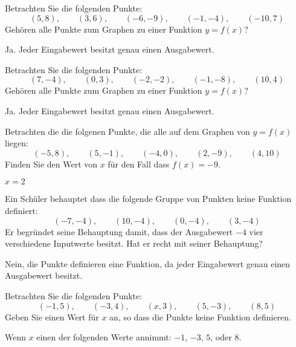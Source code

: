 \begin{exercises}
\begin{exercise} Betrachten Sie die folgenden Punkte:
\[
(5,8),\qquad (3,6), \qquad(-6,-9), \qquad(-1,-4), \qquad(-10,7)
\]
Gehören alle Punkte zum Graphen zu einer Funktion $y =f(x)$?
\begin{answer}
Ja. Jeder Eingabewert besitzt genau einen Ausgabewert.
\end{answer}
\end{exercise}


\begin{exercise} Betrachten Sie die folgenden Punkte:
\[
(7,-4),\qquad (0,3), \qquad(-2,-2), \qquad(-1,-8), \qquad(10,4)
\]
Gehören alle Punkte zum Graphen zu einer Funktion $y =f(x)$?
\begin{answer}
Ja. Jeder Eingabewert besitzt genau einen Ausgabewert.
\end{answer}
\end{exercise}


\begin{exercise} Betrachten die die folgenen Punkte, die alle auf dem Graphen von $y =f(x)$ liegen:
\[
(-5,8),\qquad (5,-1), \qquad(-4,0), \qquad(2,-9), \qquad(4,10)
\]
Finden Sie den Wert von $x$ für den Fall dass $f(x)=-9$.
\begin{answer}
$x=2$
\end{answer}
\end{exercise}

\begin{exercise} Ein Schüler behauptet dass die folgende Gruppe von Punkten keine Funktion definiert:
\[
(-7,-4),\qquad (10,-4), \qquad(0,-4), \qquad(3,-4)
\]
Er begründet seine Behauptung damit, dass der Ausgabewert $-4$ vier verschiedene Inputwerte besitzt. Hat er recht mit seiner Behauptung?

\begin{answer}
Nein, die Punkte definieren eine Funktion, da jeder Eingabewert genau einen Ausgabewert besitzt.
\end{answer}
\end{exercise}

\begin{exercise} Betrachten Sie die folgenden Punkte:
\[
(-1,5),\qquad (-3,4), \qquad(x,3), \qquad(5,-3), \qquad(8,5)
\]
Geben Sie einen Wert für $x$ an, so dass die Punkte keine Funktion definieren.
\begin{answer}
Wenn $x$ einen der folgenden Werte annimmt: $-1$, $-3$, $5$, oder $8$.
\end{answer}
\end{exercise}


\end{exercises}
